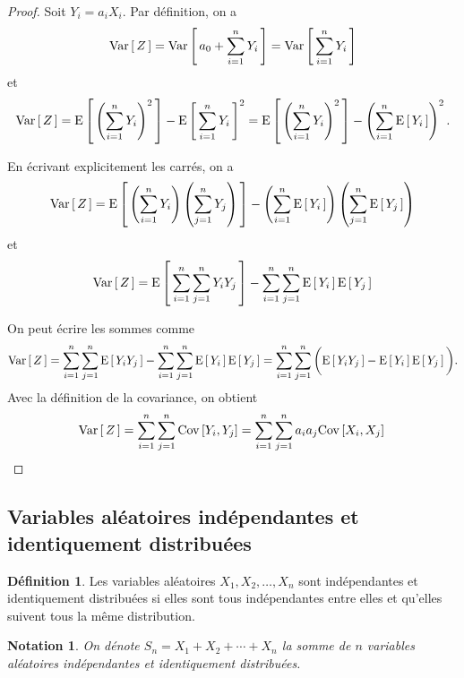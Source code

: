 \documentclass[11pt]{article}
\makeatletter
\newcommand\Esp[1]{%
	\ensuremath{%
		\mathrm{E}\left[\,#1\,\right]%
	}%
}%
\newcommand\Var[1]{%
	\ensuremath{%
		\mathrm{Var}\left[\,#1\,\right]%
	}%
}%
\newcommand\Cov[2]{%
	\ensuremath{%
		\mathrm{Cov}\left[#1,#2\right]%
	}%
}%
\newtheorem*{notation}{Notation}
\theoremstyle{remark}
\theoremstyle{definition}
\newtheorem*{@definition}{Définition}
\newenvironment{definition}{%
	\begin{@definition}%
}{%
	\end{@definition}%
	\setcounter{property}{0}%
}
\makeatother
\begin{document}
\begin{proof}
	Soit $Y_i=a_iX_i$. Par définition, on a
	\begin{equation*}
		\Var{Z}
		=\Var{a_0+\sum_{i=1}^nY_i}
		=\Var{\sum_{i=1}^nY_i}
	\end{equation*}
	et
	\begin{equation*}
		\Var{Z}
		=\Esp{\left(\sum_{i=1}^nY_i\right)^2}
		-\Esp{\sum_{i=1}^nY_i}^2
		=\Esp{\left(\sum_{i=1}^nY_i\right)^2}
		-\left(\sum_{i=1}^n\Esp{Y_i}\right)^2.
	\end{equation*}

	En écrivant explicitement les carrés, on a
	\begin{equation*}
		\Var{Z}
		=\Esp{\left(\sum_{i=1}^nY_i\right)\left(\sum_{j=1}^nY_j\right)}
		-\left(\sum_{i=1}^n\Esp{Y_i}\right)\left(\sum_{j=1}^n\Esp{Y_j}\right)
	\end{equation*}
	et
	\begin{equation*}
		\Var{Z}
		=\Esp{\sum_{i=1}^n\sum_{j=1}^nY_iY_j}
		-\sum_{i=1}^n\sum_{j=1}^n\Esp{Y_i}\Esp{Y_j}
	\end{equation*}

	On peut écrire les sommes comme
	\begin{equation*}
		\Var{Z}
		=\sum_{i=1}^n\sum_{j=1}^n\Esp{Y_iY_j}
		-\sum_{i=1}^n\sum_{j=1}^n\Esp{Y_i}\Esp{Y_j}
		=\sum_{i=1}^n\sum_{j=1}^n\bigg(\Esp{Y_iY_j}-\Esp{Y_i}\Esp{Y_j}\bigg).
	\end{equation*}
	Avec la définition de la covariance, on obtient
	\begin{equation*}
		\Var{Z}
		=\sum_{i=1}^n\sum_{j=1}^n\Cov{Y_i}{Y_j}
		=\sum_{i=1}^n\sum_{j=1}^na_ia_j\Cov{X_i}{X_j}\qedhere
	\end{equation*}
\end{proof}

\subsection{Variables aléatoires indépendantes et identiquement distribuées}
\begin{definition}
	Les variables aléatoires $X_1,X_2,\dots,X_n$ sont indépendantes et
	identiquement distribuées si elles sont tous indépendantes entre elles et
	qu'elles suivent tous la même distribution.
\end{definition}

\begin{notation}
	On dénote $S_n=X_1+X_2+\cdots+X_n$ la somme de $n$ variables aléatoires
	indépendantes et identiquement distribuées.
\end{notation}
\end{document}
